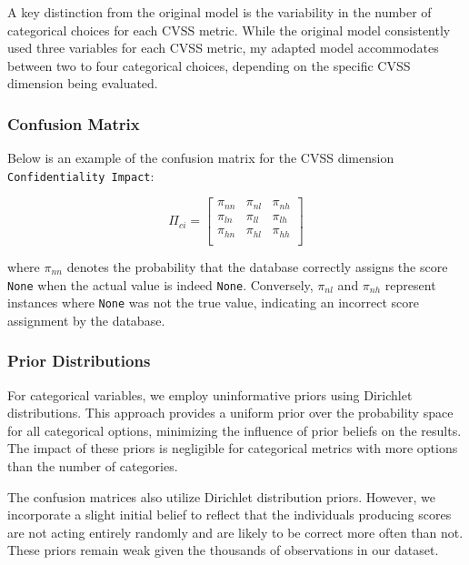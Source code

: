 \documentclass[12pt]{article}
\begin{document}
A key distinction from the original model is the variability in the number of categorical choices
for each CVSS metric. While the original model consistently used three variables for each CVSS
metric, my adapted model accommodates between two to four categorical choices, depending on the
specific CVSS dimension being evaluated.

\subsubsection{Confusion Matrix}

Below is an example of the confusion matrix for the CVSS dimension \texttt{Confidentiality Impact}:

\begin{equation}\label{confusion_matrix_formula}
	\Pi_{ci} = \begin{bmatrix}
		\pi_{nn} & \pi_{nl} & \pi_{nh} \\
		\pi_{ln} & \pi_{ll} & \pi_{lh} \\
		\pi_{hn} & \pi_{hl} & \pi_{hh} \\
	\end{bmatrix}
\end{equation}

where $\pi_{nn}$ denotes the probability that the database correctly assigns the score \texttt{None}
when the actual value is indeed \texttt{None}. Conversely, $\pi_{nl}$ and $\pi_{nh}$ represent
instances where \texttt{None} was not the true value, indicating an incorrect score assignment by
the database.

\subsubsection{Prior Distributions}

For categorical variables, we employ uninformative priors using Dirichlet distributions\cite{dirichlet}. This
approach provides a uniform prior over the probability space for all categorical options, minimizing
the influence of prior beliefs on the results. The impact of these priors is negligible for
categorical metrics with more options than the number of categories.

The confusion matrices also utilize Dirichlet distribution priors. However, we incorporate a slight
initial belief to reflect that the individuals producing scores are not acting entirely randomly and
are likely to be correct more often than not. These priors remain weak given the thousands of
observations in our dataset.
\end{document}
